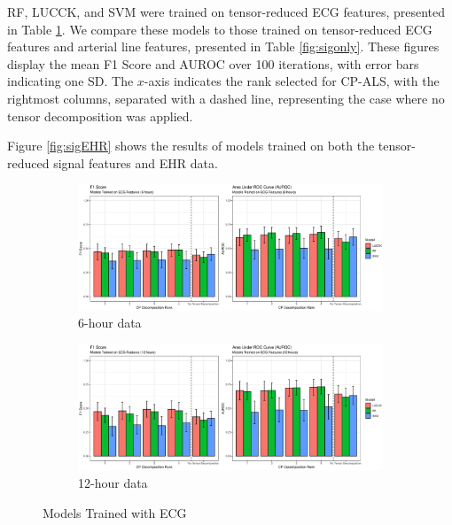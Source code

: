 RF, LUCCK, and SVM were trained on tensor-reduced ECG features, presented in Table \ref{fig:ecgonly}. We compare these models to those trained on tensor-reduced ECG features and arterial line features, presented in Table \ref{fig:sigonly}. These figures display the mean F1 Score and AUROC over 100 iterations, with error bars indicating one SD. The $x$-axis indicates the rank selected for CP-ALS, with the rightmost columns, separated with a dashed line, representing the case where no tensor decomposition was applied.

Figure \ref{fig:sigEHR} shows the results of models trained on both the tensor-reduced signal features and EHR data.

\begin{figure}[htb]
    \centering
    \begin{subfigure}[htb]{\textwidth}
        \includegraphics[width=\textwidth]{body/figures/ecg_6.eps}
        \caption{6-hour data}
    \end{subfigure}
    \hfill
    \begin{subfigure}[htb]{\textwidth}
        \includegraphics[width=\textwidth]{body/figures/ecg_12.eps}
        \caption{12-hour data}
    \end{subfigure}
    \caption{Models Trained with ECG}
    \label{fig:ecgonly}
\end{figure}  %


